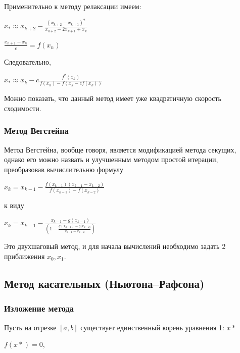 \documentclass{article}
\begin{document}
				
				Применительно к методу релаксации имеем:
				
				\begin{center}$ x_{*} \approx x_{k+2} - \frac{(x_{k+2}-x_{k+1})^2}{x_{k+2}-2x_{k+1}+x_{k}}$ 
				
				
$\frac{x_{n+1}-x_{n}}{c} = f(x_n)$ \end{center}
				
				Следовательно,
				
				\begin{center}$ x_{*} \approx x_{k} - c\frac{f^2(x_k)}{f(x_k)-f(x_k-cf(x_k))}$\end{center}  
				
				
Можно показать, что данный метод имеет уже квадратичную скорость сходимости.
				
			\subsubsection{Метод Вегстейна}
			
				Метод Вегстейна, вообще говоря, является модификацией метода секущих, однако его можно назвать и улучшенным методом простой итерации, преобразовав вычислительню формулу
				
				\begin{center}$x_k = x_{k-1} - \frac{f(x_{k-1})(x_{k-1}-x_{k-2})}{f(x_{k-1})-f(x_{k-2})}$\end{center}
к виду

				\begin{center}$x_{k}=x_{k-1} - \frac{x_{k-1}-g(x_{k-1})}{(1-\frac{g(x_{k-1})-g(x_{k-2)}}{x_{k-1}-x_{k-2}})}$\end{center}
				
				
				Это двухшаговый метод, и для начала вычислений необходимо задать 2 приближения $x_0,x_1$.
				
		\subsection{Метод касательных (Ньютона–Рафсона)}
		
			\subsubsection{Изложение метода}
			
				Пусть на отрезке $[a,b]$ существует единственный корень уравнения 1: $x*$
				
				\begin{center}$f(x*)=0$,\end{center} 
				
\end{document}

